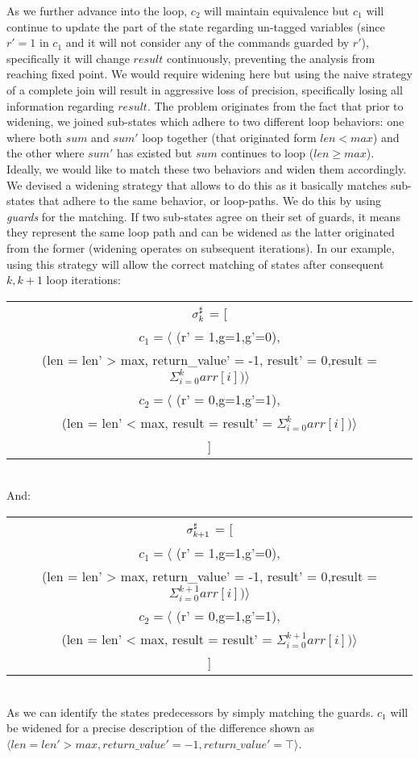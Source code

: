 As we further advance into the loop, $c_2$ will maintain equivalence but $c_1$ will continue to update the part of the state regarding un-tagged variables  (since $r'=1$ in $c_1$ and it will not consider any of the commands guarded by $r'$), specifically it will change $result$ continuously, preventing the analysis from reaching fixed point. We would require widening here but using the naive strategy of a complete join will result in aggressive loss of precision, specifically losing all information regarding $result$. The problem originates from the fact that prior to widening, we joined sub-states which adhere to two different loop behaviors: one where both $sum$ and $sum'$ loop together (that originated form $len < max$) and the other where $sum'$ has existed but $sum$ continues to loop ($len \geq max$). Ideally, we would like to match these two behaviors and widen them accordingly. We devised a widening strategy that allows to do this as it basically matches sub-states that adhere to the same behavior, or loop-paths. We do this by using \emph{guards} for the matching. If two sub-states agree on their set of guards, it means they represent the same loop path and can be widened as the latter originated from the former (widening operates on subsequent iterations). In our example, using this strategy will allow the correct matching of states after consequent $k, k+1$ loop iterations:
\\
\begin{tabular}{c}
$\sigma^\sharp_{k}$ = [
\\
$c_1 = \langle$ (r' = 1,g=1,g'=0),
\\
(len = len' > max, return\_value' = -1,
 result' = 0,result = $\Sigma_{i=0}^{k} arr[i]) \rangle$
\\
$c_2 = \langle$ (r' = 0,g=1,g'=1),
\\
(len = len' < max, result = result' = $\Sigma_{i=0}^{k} arr[i]) \rangle$
\\
]
\end{tabular}
\\
And:
\\
\begin{tabular}{c}
$\sigma^\sharp_{k+1}$ = [
\\
$c_1 = \langle$ (r' = 1,g=1,g'=0),
\\
(len = len' > max, return\_value' = -1,
 result' = 0,result = $\Sigma_{i=0}^{k+1} arr[i]) \rangle$
\\
$c_2 = \langle$ (r' = 0,g=1,g'=1),
\\
(len = len' < max, result = result' = $\Sigma_{i=0}^{k+1} arr[i]) \rangle$
\\
]
\end{tabular}
\\
As we can identify the states predecessors by simply matching the guards. $c_1$ will be widened for a precise description of the difference shown as $\langle len = len' > max, return\_value' = -1, return\_value' = \top \rangle$.

